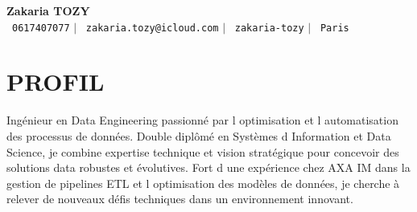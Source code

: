 \documentclass[letterpaper,11pt]{article}
\begin{document}
\begin{center}
    \textbf{\Huge Zakaria TOZY} \\ \vspace{5pt}
    \small \faPhone\ \texttt{0617407077} \hspace{1pt} $|$
    \hspace{1pt} \faEnvelope\ \texttt{zakaria.tozy@icloud.com} \hspace{1pt} $|$
    \hspace{1pt} \faLinkedin\ \texttt{zakaria-tozy} \hspace{1pt} $|$
    \hspace{1pt} \faMapMarker\ \texttt{Paris}
    \\ \vspace{-3pt}
\end{center}

\section{PROFIL}
\begin{itemize}[leftmargin=0in, label={}]
\small{\item{
Ing\'{e}nieur en Data Engineering passionn\'{e} par l optimisation et l automatisation des processus de donn\'{e}es. Double dipl\^{o}m\'{e} en Syst\`{e}mes d Information et Data Science, je combine expertise technique et vision strat\'{e}gique pour concevoir des solutions data robustes et \'{e}volutives. Fort d une exp\'{e}rience chez AXA IM dans la gestion de pipelines ETL et l optimisation des mod\`{e}les de donn\'{e}es, je cherche \`{a} relever de nouveaux d\'{e}fis techniques dans un environnement innovant.
}}
\end{itemize}
\end{document}
